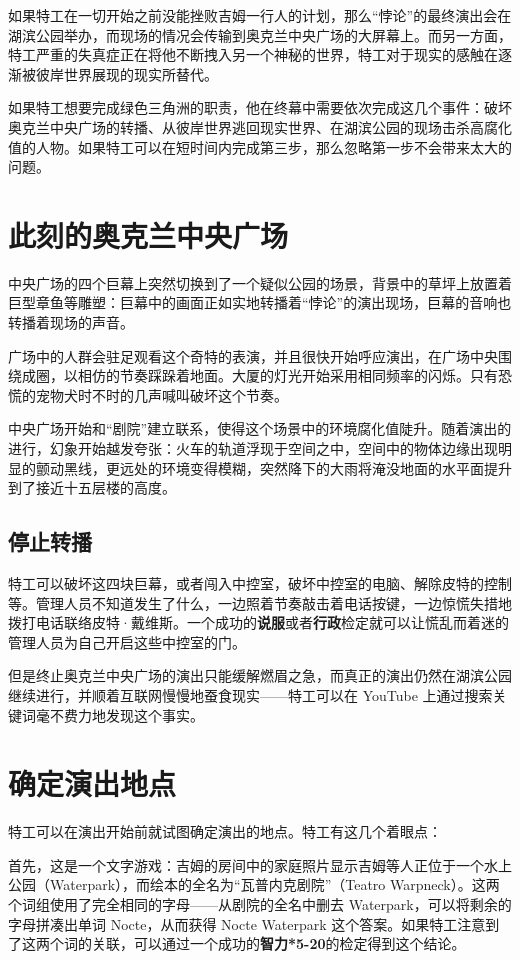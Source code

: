 如果特工在一切开始之前没能挫败吉姆一行人的计划，那么“悖论”的最终演出会在湖滨公园举办，而现场的情况会传输到奥克兰中央广场的大屏幕上。而另一方面，特工严重的失真症正在将他不断拽入另一个神秘的世界，特工对于现实的感触在逐渐被彼岸世界展现的现实所替代。

如果特工想要完成绿色三角洲的职责，他在终幕中需要依次完成这几个事件：破坏奥克兰中央广场的转播、从彼岸世界逃回现实世界、在湖滨公园的现场击杀高腐化值的人物。如果特工可以在短时间内完成第三步，那么忽略第一步不会带来太大的问题。

\section{此刻的奥克兰中央广场}

中央广场的四个巨幕上突然切换到了一个疑似公园的场景，背景中的草坪上放置着巨型章鱼等雕塑：巨幕中的画面正如实地转播着“悖论”的演出现场，巨幕的音响也转播着现场的声音。

广场中的人群会驻足观看这个奇特的表演，并且很快开始呼应演出，在广场中央围绕成圈，以相仿的节奏踩跺着地面。大厦的灯光开始采用相同频率的闪烁。只有恐慌的宠物犬时不时的几声喊叫破坏这个节奏。

中央广场开始和“剧院”建立联系，使得这个场景中的环境腐化值陡升。随着演出的进行，幻象开始越发夸张：火车的轨道浮现于空间之中，空间中的物体边缘出现明显的颤动黑线，更远处的环境变得模糊，突然降下的大雨将淹没地面的水平面提升到了接近十五层楼的高度。

\subsection{停止转播}

特工可以破坏这四块巨幕，或者闯入中控室，破坏中控室的电脑、解除皮特的控制等。管理人员不知道发生了什么，一边照着节奏敲击着电话按键，一边惊慌失措地拨打电话联络皮特·戴维斯。一个成功的\textbf{说服}或者\textbf{行政}检定就可以让慌乱而着迷的管理人员为自己开启这些中控室的门。

但是终止奥克兰中央广场的演出只能缓解燃眉之急，而真正的演出仍然在湖滨公园继续进行，并顺着互联网慢慢地蚕食现实——特工可以在 YouTube 上通过搜索关键词毫不费力地发现这个事实。

\section{确定演出地点}

特工可以在演出开始前就试图确定演出的地点。特工有这几个着眼点：

首先，这是一个文字游戏：吉姆的房间中的家庭照片显示吉姆等人正位于一个水上公园（Waterpark），而绘本的全名为“瓦普内克剧院”（Teatro Warpneck）。这两个词组使用了完全相同的字母——从剧院的全名中删去 Waterpark，可以将剩余的字母拼凑出单词 Nocte，从而获得 Nocte Waterpark 这个答案。如果特工注意到了这两个词的关联，可以通过一个成功的\textbf{智力*5-20}的检定得到这个结论。

